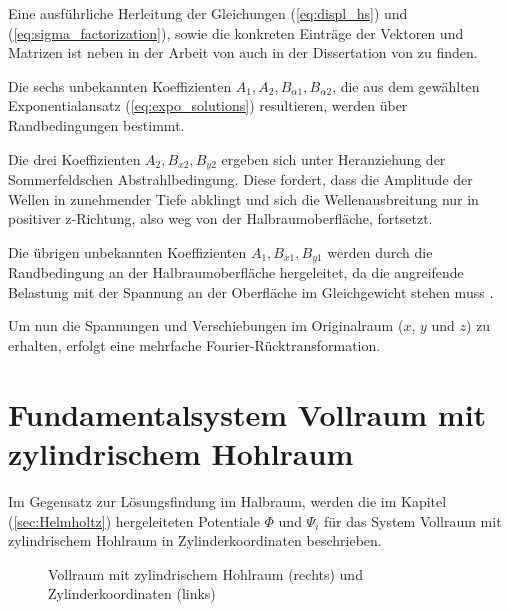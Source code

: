 Eine ausführliche Herleitung der Gleichungen (\ref{eq:displ_hs}) und (\ref{eq:sigma_factorization}), sowie die konkreten Einträge der Vektoren und Matrizen ist neben in der Arbeit von \cite{Fruehe2010} auch in der Dissertation von \cite{Mueller2007} zu finden.


Die sechs unbekannten Koeffizienten \(A_1, A_2, B_{\alpha1}, B_{\alpha2}\), die aus dem gewählten Exponentialansatz (\ref{eq:expo_solutions}) resultieren, werden über Randbedingungen bestimmt.

Die drei Koeffizienten \(A_2, B_{x2}, B_{y2}\) ergeben sich unter Heranziehung der Sommerfeldschen Abstrahlbedingung. Diese fordert, dass die Amplitude der Wellen in zunehmender Tiefe abklingt und sich die Wellenausbreitung nur in positiver z-Richtung, also weg von der Halbraumoberfläche, fortsetzt.

Die übrigen unbekannten Koeffizienten \(A_1, B_{x1}, B_{y1}\) werden durch die Randbedingung an der Halbraumoberfläche hergeleitet, da die angreifende Belastung mit der Spannung an der Oberfläche im Gleichgewicht stehen muss \citep{Mueller2007}.

Um nun die Spannungen und Verschiebungen im Originalraum ($x$, $y$ und $z$) zu erhalten, erfolgt eine mehrfache Fourier-Rücktransformation. 



\section{Fundamentalsystem Vollraum mit zylindrischem Hohlraum}
\label{sec:Zylinder}

Im Gegensatz zur Lösungsfindung im Halbraum, werden die im Kapitel (\ref{sec:Helmholtz}) hergeleiteten Potentiale $\Phi$ und $\Psi_{i}$ für das System Vollraum mit zylindrischem Hohlraum in Zylinderkoordinaten beschrieben. 
\begin{figure}[H]
	\centering
	\begin{subfigure}[t]{0.48\textwidth}
		\hspace*{25mm}
		\centering
		
		\label{fig:cyl_a}
	\end{subfigure}\hfill
	\begin{subfigure}[t]{0.48\textwidth}
		\centering
			\hspace*{-7mm}
		
		\label{fig:cyl_b}
	\end{subfigure}
	\caption{Vollraum mit zylindrischem Hohlraum (rechts) und Zylinderkoordinaten (links) \citep{Freisinger2022}}
	\label{fig:cyl_pair}
\end{figure}


